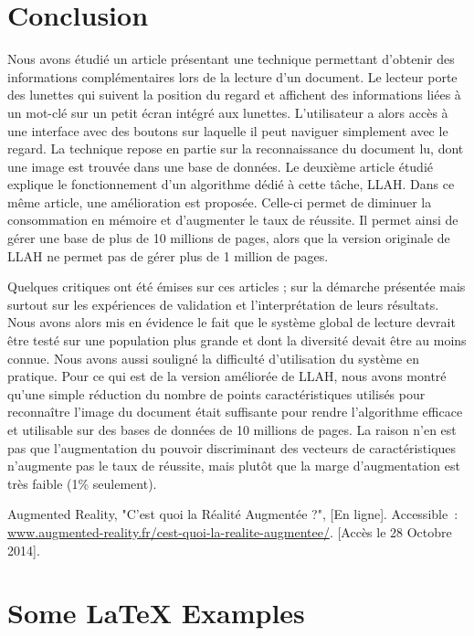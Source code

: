 \documentclass[a4paper]{article}
\begin{document}
\section{Conclusion}
Nous avons étudié un article présentant une technique permettant d'obtenir des informations complémentaires lors de la lecture d'un document. Le lecteur porte des lunettes qui suivent la position du regard et affichent des informations liées à un mot-clé sur un petit écran intégré aux lunettes. L'utilisateur a alors accès à une interface avec des boutons sur laquelle il peut naviguer simplement avec le regard. La technique repose en partie sur la reconnaissance du document lu, dont une image est trouvée dans une base de données. Le deuxième article étudié explique le fonctionnement d'un algorithme dédié à cette tâche, LLAH. Dans ce même article, une amélioration est proposée. Celle-ci permet de diminuer la consommation en mémoire et d'augmenter le taux de réussite. Il permet ainsi de gérer une base de plus de 10 millions de pages, alors que la version originale de LLAH ne permet pas de gérer plus de 1 million de pages.

Quelques critiques ont été émises sur ces articles ; sur la démarche présentée mais surtout sur les expériences de validation et l'interprétation de leurs résultats. Nous avons alors mis en évidence le fait que le système global de lecture devrait être testé sur une population plus grande et dont la diversité devait être au moins connue. Nous avons aussi souligné la difficulté d'utilisation du système en pratique. Pour ce qui est de la version améliorée de LLAH, nous avons montré qu'une simple réduction du nombre de points caractéristiques utilisés pour reconnaître l'image du document était suffisante pour rendre l'algorithme efficace et utilisable sur des bases de données de 10 millions de pages. La raison n'en est pas que l'augmentation du pouvoir discriminant des vecteurs de caractéristiques n'augmente pas le taux de réussite, mais plutôt que la marge d'augmentation est très faible (1\% seulement).



\begin{thebibliography}{1}
	 Augmented Reality, "C'est quoi la Réalité Augmentée ?", [En ligne]. Accessible~: \url{www.augmented-reality.fr/cest-quoi-la-realite-augmentee/}. [Accès le 28 Octobre 2014].
\end{thebibliography}

\newpage

\section{Some \LaTeX{} Examples}
\label{sec:examples}
\end{document}
